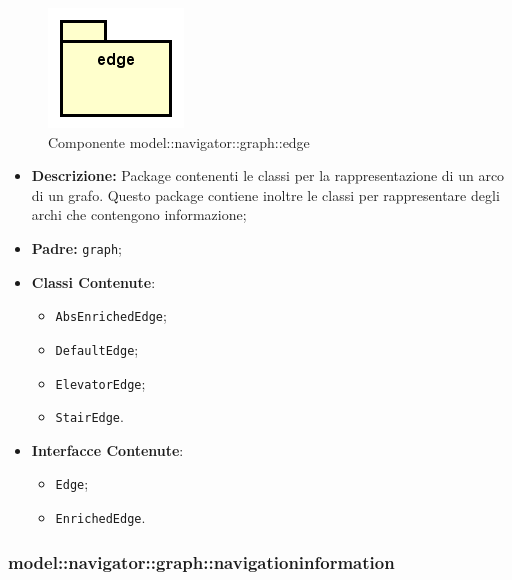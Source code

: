\documentclass[../DefinizioneDiProdotto.tex]{subfiles}
\begin{document}
    \begin{figure}[H]
        \centering
        \includegraphics{img/package/edge.png}
        \caption{Componente model::\-navigator::\-graph::\-edge}\label{fig:model::navigator::graph::edge} 
    \end{figure}
    \begin{itemize}
\item \textbf{Descrizione:} Package contenenti le classi per la rappresentazione di un arco di un grafo. Questo package contiene inoltre le classi per rappresentare degli archi che contengono informazione;
\item \textbf{Padre:} \texttt{graph};
\item \textbf{Classi Contenute}:
\begin{itemize}
\item \texttt{AbsEnrichedEdge};

\item \texttt{DefaultEdge};

\item \texttt{ElevatorEdge};

\item \texttt{StairEdge}.

\end{itemize}
\item \textbf{Interfacce Contenute}:
\begin{itemize}
\item \texttt{Edge};

\item \texttt{EnrichedEdge}.

\end{itemize}
\end{itemize}

\subsubsection{model::\-navigator::\-graph::\-navigationinformation}
\end{document}
